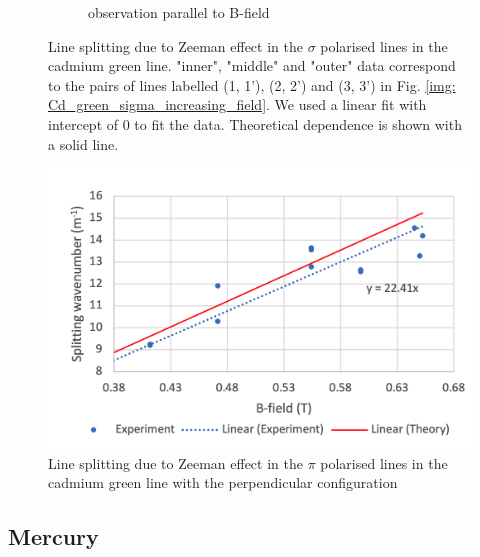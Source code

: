 \documentclass[11pt]{article}
\begin{document}
\begin{figure}[h!]
\begin{subfigure}{0.47\linewidth}
        \caption{observation parallel to B-field}
        \label{fig: Cd green sig par}
    \end{subfigure}
    \caption{Line splitting due to Zeeman effect in the $\sigma$ polarised lines in the cadmium green line. "inner", "middle" and "outer" data correspond to the pairs of lines labelled (1, 1'), (2, 2') and (3, 3') in Fig. \ref{img: Cd_green_sigma_increasing_field}. We used a linear fit with intercept of 0 to fit the data. Theoretical dependence is shown with a solid line.}
\end{figure}

\begin{figure}[h!]
    \centering
    \includegraphics[width=0.7\linewidth]{Cd green pi perp small.png}
    \captionsetup{justification=centering}
    \captionsetup{width=\linewidth}
    \caption{Line splitting due to Zeeman effect in the $\pi$ polarised lines in the cadmium green line with the perpendicular configuration}
    \label{fig: Cd green pi}
\end{figure}

\newpage

\subsection{Mercury}
\end{document}
